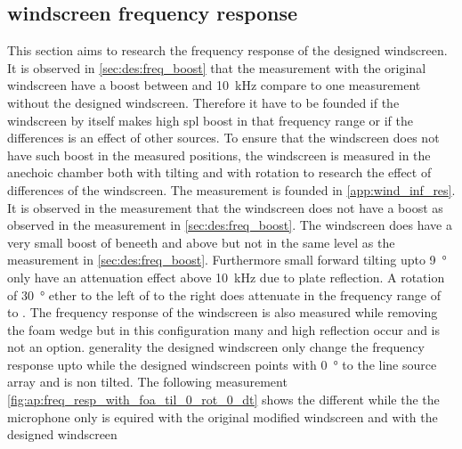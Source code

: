 \subsection{windscreen frequency response}\label{sec:ds:wind_freq_res}
This section aims to research the frequency response of the designed windscreen. It is observed in \autoref{sec:des:freq_boost} that the measurement with the original windscreen have a boost between  and \SI{10}{\kilo\hertz} compare to one measurement without the designed windscreen. Therefore it have to be founded if the windscreen by itself makes high \gls{spl} boost in that frequency range or if the differences is an effect of other sources. To ensure that the windscreen does not have such boost in the measured positions, the windscreen is measured in the anechoic chamber both with tilting and with rotation to research the effect of differences of the windscreen. The measurement is founded in \autoref{app:wind_inf_res}. It is observed in the measurement that the windscreen does not have a boost as observed in the measurement in \autoref{sec:des:freq_boost}. The windscreen does have a very small boost of  beneeth  and above  but not in the same level as the measurement in \autoref{sec:des:freq_boost}. Furthermore small forward tilting upto \SI{9}{\degree} only have an attenuation effect above \SI{10}{\kilo\hertz} due to plate reflection. A rotation of \SI{30}{\degree} ether to the left of to the right does attenuate in the frequency range of  to . The frequency response of the windscreen is also measured while removing the foam wedge but in this configuration many and high reflection occur and is not an option. generality the designed windscreen only change the frequency response upto  while the designed windscreen points with \SI{0}{\degree} to the line source array and is non tilted. The following measurement \autoref{fig:ap:freq_resp_with_foa_til_0_rot_0_dt} shows the different while the the microphone only is equired with the original modified windscreen and with the designed windscreen





